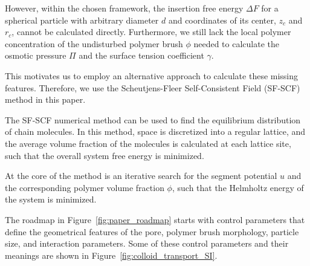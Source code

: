 \documentclass[10pt, a4paper]{article}
\begin{document}
\begin{multicols}{2}
However, within the chosen framework, the insertion free energy $\Delta F$ for a spherical particle with arbitrary diameter $d$ and coordinates of its center, $z_c$ and $r_c$, cannot be calculated directly.
Furthermore, we still lack the local polymer concentration of the undisturbed polymer brush $\phi$ needed to calculate the osmotic pressure $\Pi$ and the surface tension coefficient $\gamma$.

This motivates us to employ an alternative approach to calculate these missing features.
Therefore, we use the Scheutjens-Fleer Self-Consistent Field (SF-SCF) method in this paper.

The SF-SCF numerical method can be used to find the equilibrium distribution of chain molecules.
In this method, space is discretized into a regular lattice, and the average volume fraction of the molecules is calculated at each lattice site, such that the overall system free energy is minimized.

At the core of the method is an iterative search for the segment potential $u$ and the corresponding polymer volume fraction $\phi$, such that the Helmholtz energy of the system is minimized.

The roadmap in Figure~\ref{fig:paper_roadmap} starts with control parameters that define the geometrical features of the pore, polymer brush morphology, particle size, and interaction parameters.
Some of these control parameters and their meanings are shown in Figure~\ref{fig:colloid_transport_SI}.

\end{multicols}

\end{document}
